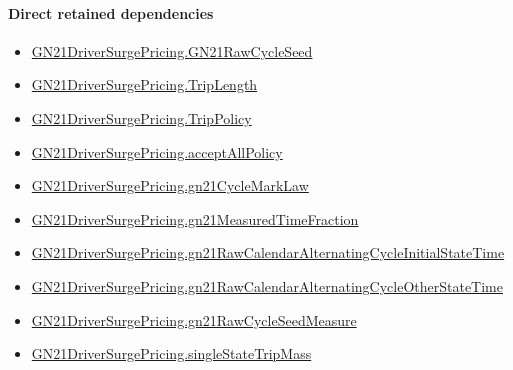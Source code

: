 \documentclass[10pt]{article}
\begin{document}
\paragraph{Direct retained dependencies}
\begin{itemize}\raggedright
\item \hyperlink{governing-declaration-228de34d5811f602}{GN21\allowbreak{}Driver\allowbreak{}Surge\allowbreak{}Pricing.\allowbreak{}GN21\allowbreak{}Raw\allowbreak{}Cycle\allowbreak{}Seed}
\item \hyperlink{governing-declaration-a616c143f22cf2bc}{GN21\allowbreak{}Driver\allowbreak{}Surge\allowbreak{}Pricing.\allowbreak{}Trip\allowbreak{}Length}
\item \hyperlink{governing-declaration-4312ad4cb899871f}{GN21\allowbreak{}Driver\allowbreak{}Surge\allowbreak{}Pricing.\allowbreak{}Trip\allowbreak{}Policy}
\item \hyperlink{governing-declaration-e94c9281d4f4b12d}{GN21\allowbreak{}Driver\allowbreak{}Surge\allowbreak{}Pricing.\allowbreak{}accept\allowbreak{}All\allowbreak{}Policy}
\item \hyperlink{governing-declaration-efacc1fa91256093}{GN21\allowbreak{}Driver\allowbreak{}Surge\allowbreak{}Pricing.\allowbreak{}gn21\allowbreak{}Cycle\allowbreak{}Mark\allowbreak{}Law}
\item \hyperlink{governing-declaration-b546250b44884c6e}{GN21\allowbreak{}Driver\allowbreak{}Surge\allowbreak{}Pricing.\allowbreak{}gn21\allowbreak{}Measured\allowbreak{}Time\allowbreak{}Fraction}
\item \hyperlink{governing-declaration-dc83c84bf96f074a}{GN21\allowbreak{}Driver\allowbreak{}Surge\allowbreak{}Pricing.\allowbreak{}gn21\allowbreak{}Raw\allowbreak{}Calendar\allowbreak{}Alternating\allowbreak{}Cycle\allowbreak{}Initial\allowbreak{}State\allowbreak{}Time}
\item \hyperlink{governing-declaration-1bd54a6abce4e516}{GN21\allowbreak{}Driver\allowbreak{}Surge\allowbreak{}Pricing.\allowbreak{}gn21\allowbreak{}Raw\allowbreak{}Calendar\allowbreak{}Alternating\allowbreak{}Cycle\allowbreak{}Other\allowbreak{}State\allowbreak{}Time}
\item \hyperlink{governing-declaration-c0f7bde0d191339c}{GN21\allowbreak{}Driver\allowbreak{}Surge\allowbreak{}Pricing.\allowbreak{}gn21\allowbreak{}Raw\allowbreak{}Cycle\allowbreak{}Seed\allowbreak{}Measure}
\item \hyperlink{governing-declaration-1c88cf5996e161d3}{GN21\allowbreak{}Driver\allowbreak{}Surge\allowbreak{}Pricing.\allowbreak{}single\allowbreak{}State\allowbreak{}Trip\allowbreak{}Mass}
\end{itemize}
\end{document}
